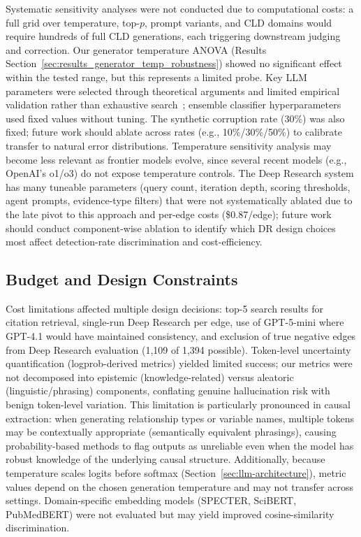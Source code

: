 Systematic sensitivity analyses were not conducted due to computational costs: a full grid over temperature, top-$p$, prompt variants, and CLD domains would require hundreds of full CLD generations, each triggering downstream judging and correction. Our generator temperature ANOVA (Results Section~\ref{sec:results_generator_temp_robustness}) showed no significant effect within the tested range, but this represents a limited probe. Key LLM parameters were selected through theoretical arguments and limited empirical validation rather than exhaustive search~\citep{liu2023gevalnlgevaluationusing, zheng2024judging, madaan2023selfrefineiterativerefinementselffeedback}; ensemble classifier hyperparameters used fixed values without tuning. The synthetic corruption rate (30\%) was also fixed; future work should ablate across rates (e.g., 10\%/30\%/50\%) to calibrate transfer to natural error distributions. Temperature sensitivity analysis may become less relevant as frontier models evolve, since several recent models (e.g., OpenAI's o1/o3) do not expose temperature controls. The Deep Research system has many tuneable parameters (query count, iteration depth, scoring thresholds, agent prompts, evidence-type filters) that were not systematically ablated due to the late pivot to this approach and per-edge costs (\$0.87/edge); future work should conduct component-wise ablation to identify which DR design choices most affect detection-rate discrimination and cost-efficiency.

\subsection{Budget and Design Constraints}

Cost limitations affected multiple design decisions: top-5 search results for citation retrieval, single-run Deep Research per edge, use of GPT-5-mini where GPT-4.1 would have maintained consistency, and exclusion of true negative edges from Deep Research evaluation (1,109 of 1,394 possible). Token-level uncertainty quantification (logprob-derived metrics) yielded limited success; our metrics were not decomposed into epistemic (knowledge-related) versus aleatoric (linguistic/phrasing) components, conflating genuine hallucination risk with benign token-level variation. This limitation is particularly pronounced in causal extraction: when generating relationship types or variable names, multiple tokens may be contextually appropriate (semantically equivalent phrasings), causing probability-based methods to flag outputs as unreliable even when the model has robust knowledge of the underlying causal structure. Additionally, because temperature scales logits before softmax (Section~\ref{sec:llm-architecture}), metric values depend on the chosen generation temperature and may not transfer across settings. Domain-specific embedding models (SPECTER, SciBERT, PubMedBERT) were not evaluated but may yield improved cosine-similarity discrimination.

